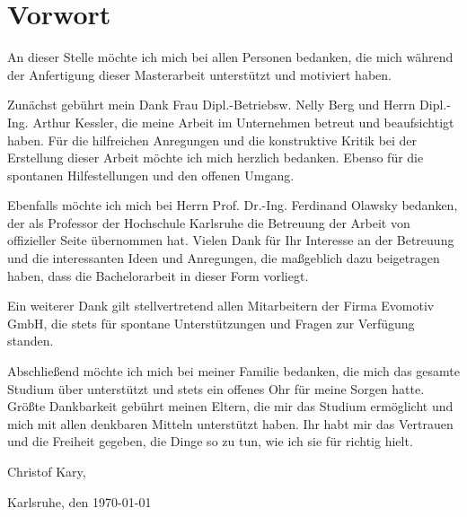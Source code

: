 \chapter*{Vorwort}
\thispagestyle{empty}

An dieser Stelle möchte ich mich bei allen Personen bedanken, die mich während der Anfertigung dieser Masterarbeit unterstützt und motiviert haben.

Zunächst gebührt mein Dank Frau Dipl.-Betriebsw. Nelly Berg und Herrn Dipl.-Ing. Arthur Kessler, die meine Arbeit im Unternehmen betreut und beaufsichtigt haben. Für die hilfreichen Anregungen und die konstruktive Kritik bei der Erstellung dieser Arbeit möchte ich mich herzlich bedanken. Ebenso für die spontanen Hilfestellungen und den offenen Umgang. 

Ebenfalls möchte ich mich bei Herrn Prof. Dr.-Ing. Ferdinand Olawsky bedanken, der als Professor der Hochschule Karlsruhe die Betreuung der Arbeit von offizieller Seite übernommen hat. Vielen Dank für Ihr Interesse an der Betreuung und die interessanten Ideen und Anregungen, die maßgeblich dazu beigetragen haben, dass die Bachelorarbeit in dieser Form vorliegt.

Ein weiterer Dank gilt stellvertretend allen Mitarbeitern der Firma Evomotiv GmbH, die stets für spontane Unterstützungen und Fragen zur Verfügung standen.

Abschließend möchte ich mich bei meiner Familie bedanken, die mich das gesamte Studium über unterstützt und stets ein offenes Ohr für meine Sorgen hatte. Größte Dankbarkeit gebührt meinen Eltern, die mir das Studium ermöglicht und mich mit allen denkbaren Mitteln unterstützt haben. Ihr habt mir das Vertrauen und die Freiheit gegeben, die Dinge so zu tun, wie ich sie für richtig hielt.

\vspace{10mm}
Christof Kary,

Karlsruhe, den \today

